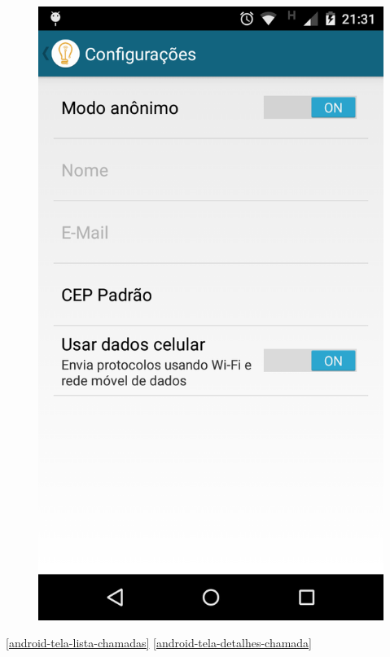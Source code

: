 \documentclass[
	article,			%
	11pt,				%
	oneside,			%
	a4paper,			%
	english,			%
	brazil,				%
	sumario=tradicional
	]{abntex2}
\begin{document}
\begin{figure}[!htbp]
\begin{minipage}{0.4\textwidth}
    \includegraphics[scale=0.1]{android/9.png}
  \end{minipage}
\end{figure}

\ref{android-tela-lista-chamadas} \ref{android-tela-detalhes-chamada}
\end{document}
